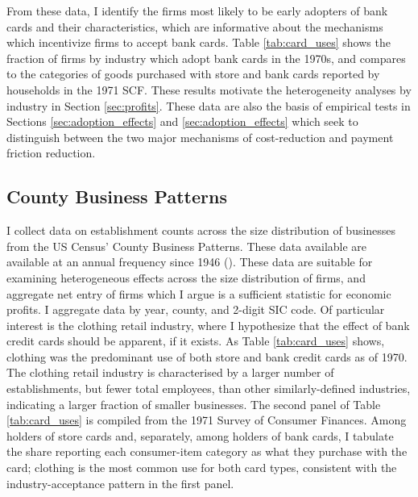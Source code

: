 \documentclass[12pt,english]{article}
\begin{document}
From these data, I identify the firms most likely to be early adopters of bank cards and their characteristics, which are informative about the mechanisms which incentivize firms to accept bank cards. Table \ref{tab:card_uses} shows the fraction of firms by industry which adopt bank cards in the 1970s, and compares to the categories of goods purchased with store and bank cards reported by households in the 1971 SCF. These results motivate the heterogeneity analyses by industry in Section \ref{sec:profits}. These data are also the basis of empirical tests in Sections \ref{sec:adoption_effects} and \ref{sec:adoption_effects} which seek to distinguish between the two major mechanisms of cost-reduction and payment friction reduction. 

\subsection{County Business Patterns}

I collect data on establishment counts across the size distribution of businesses from the US Census' County Business Patterns. These data available are available at an annual frequency since 1946 (\cite{eckert_early_2022}). These data are suitable for examining heterogeneous effects across the size distribution of firms, and aggregate net entry of firms which I argue is a sufficient statistic for economic profits. I aggregate data by year, county, and 2-digit SIC code. Of particular interest is the clothing retail industry, where I hypothesize that the effect of bank credit cards should be apparent, if it exists. As Table \ref{tab:card_uses} shows, clothing was the predominant use of both store and bank credit cards as of 1970. The clothing retail industry is characterised by a larger number of establishments, but fewer total employees, than other similarly-defined industries, indicating a larger fraction of smaller businesses. The second panel of Table \ref{tab:card_uses} is compiled from the 1971 Survey of Consumer Finances. Among holders of store cards and, separately, among holders of bank cards, I tabulate the share reporting each consumer-item category as what they purchase with the card; clothing is the most common use for both card types, consistent with the industry-acceptance pattern in the first panel. 
\end{document}
